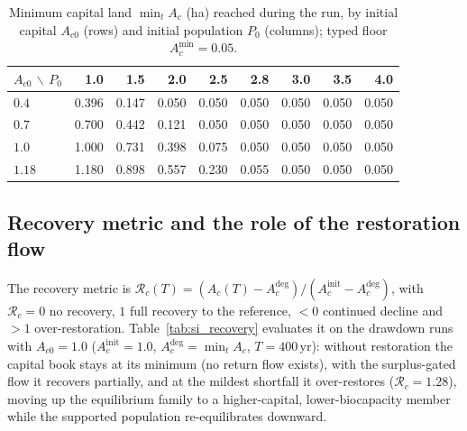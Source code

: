 \documentclass[11pt,a4paper]{article}
\newcommand{\Acmin}{A_c^{\min}}
\begin{document}
\begin{table}[htbp]
\centering\small
\caption{Minimum capital land $\min_tA_c$ (ha) reached during the run, by initial capital $A_{c0}$ (rows) and initial population $P_0$ (columns); typed floor $\Acmin=0.05$.}
\label{tab:si_drawdown}
\begin{tabular}{lrrrrrrrr}
\toprule
$A_{c0}$ $\backslash$ $P_0$ & 1.0 & 1.5 & 2.0 & 2.5 & 2.8 & 3.0 & 3.5 & 4.0 \\
\midrule
$0.4$ & 0.396 & 0.147 & 0.050 & 0.050 & 0.050 & 0.050 & 0.050 & 0.050 \\
$0.7$ & 0.700 & 0.442 & 0.121 & 0.050 & 0.050 & 0.050 & 0.050 & 0.050 \\
$1.0$ & 1.000 & 0.731 & 0.398 & 0.075 & 0.050 & 0.050 & 0.050 & 0.050 \\
$1.18$ & 1.180 & 0.898 & 0.557 & 0.230 & 0.055 & 0.050 & 0.050 & 0.050 \\
\bottomrule
\end{tabular}
\end{table}

\subsection{Recovery metric and the role of the restoration flow}\label{si:recovery}

The recovery metric is $\mathcal R_c(T)=(A_c(T)-A_c^{\mathrm{deg}})/(A_c^{\mathrm{init}}-A_c^{\mathrm{deg}})$, with $\mathcal R_c=0$ no recovery, $1$ full recovery to the reference, $<0$ continued decline and $>1$ over-restoration. Table~\ref{tab:si_recovery} evaluates it on the drawdown runs with $A_{c0}=1.0$ ($A_c^{\mathrm{init}}=1.0$, $A_c^{\mathrm{deg}}=\min_tA_c$, $T=400$\,yr): without restoration the capital book stays at its minimum (no return flow exists), with the surplus-gated flow it recovers partially, and at the mildest shortfall it over-restores ($\mathcal R_c=1.28$), moving up the equilibrium family to a higher-capital, lower-biocapacity member while the supported population re-equilibrates downward.
\end{document}
